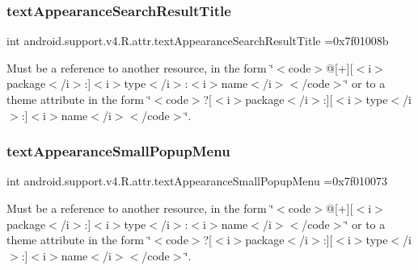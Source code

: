 \subsubsection{\texorpdfstring{text\+Appearance\+Search\+Result\+Title}{textAppearanceSearchResultTitle}}
{\footnotesize\ttfamily int android.\+support.\+v4.\+R.\+attr.\+text\+Appearance\+Search\+Result\+Title =0x7f01008b\hspace{0.3cm}{\ttfamily [static]}}

Must be a reference to another resource, in the form \char`\"{}$<$code$>$@\mbox{[}+\mbox{]}\mbox{[}$<$i$>$package$<$/i$>$\+:\mbox{]}$<$i$>$type$<$/i$>$\+:$<$i$>$name$<$/i$>$$<$/code$>$\char`\"{} or to a theme attribute in the form \char`\"{}$<$code$>$?\mbox{[}$<$i$>$package$<$/i$>$\+:\mbox{]}\mbox{[}$<$i$>$type$<$/i$>$\+:\mbox{]}$<$i$>$name$<$/i$>$$<$/code$>$\char`\"{}. \mbox{\label{classandroid_1_1support_1_1v4_1_1R_1_1attr_aac7597ce08870b189e08a6fdb490bccf}} 
\subsubsection{\texorpdfstring{text\+Appearance\+Small\+Popup\+Menu}{textAppearanceSmallPopupMenu}}
{\footnotesize\ttfamily int android.\+support.\+v4.\+R.\+attr.\+text\+Appearance\+Small\+Popup\+Menu =0x7f010073\hspace{0.3cm}{\ttfamily [static]}}

Must be a reference to another resource, in the form \char`\"{}$<$code$>$@\mbox{[}+\mbox{]}\mbox{[}$<$i$>$package$<$/i$>$\+:\mbox{]}$<$i$>$type$<$/i$>$\+:$<$i$>$name$<$/i$>$$<$/code$>$\char`\"{} or to a theme attribute in the form \char`\"{}$<$code$>$?\mbox{[}$<$i$>$package$<$/i$>$\+:\mbox{]}\mbox{[}$<$i$>$type$<$/i$>$\+:\mbox{]}$<$i$>$name$<$/i$>$$<$/code$>$\char`\"{}. \mbox{\label{classandroid_1_1support_1_1v4_1_1R_1_1attr_a03a5e3e3dd99d4e3da661dc7f6c22b3a}} 
